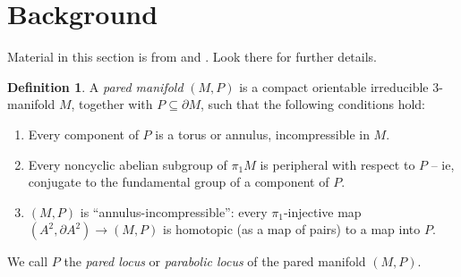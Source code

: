 \documentclass[12pt]{amsart}
\theoremstyle{definition}
\newtheorem{Def}[theorem]{Definition}
\theoremstyle{remark}
\newcommand{\bd}{\partial}
\newcommand{\Si}{\Sigma}
\newcommand{\cin}{\subseteq}
\begin{document}
%
%
%
%

\section{Background}

Material in this section is from \cite{Mo} and \cite{CMc}. Look there for
further details.

%
\begin{Def}

A \emph{pared manifold} $(M,P)$ is a compact orientable irreducible 3-manifold
$M$, together with $P\cin\bd M$, such that the following conditions hold:

\begin{enumerate}
\item Every component of $P$ is a torus or annulus, incompressible in $M$.

\item Every noncyclic abelian subgroup of $\pi_1M$ is peripheral with respect
to $P$ -- ie, conjugate to the fundamental group of a component of $P$.

\item $(M,P)$ is ``annulus-incompressible'': every $\pi_1$-injective map $(A^2,
\bd A^2) \to (M,P)$ is homotopic (as a map of pairs) to a map into $P$.

\end{enumerate}

We call $P$ the \emph{pared locus} or \emph{parabolic locus} of the pared
manifold $(M,P)$.

\end{Def}
\end{document}
